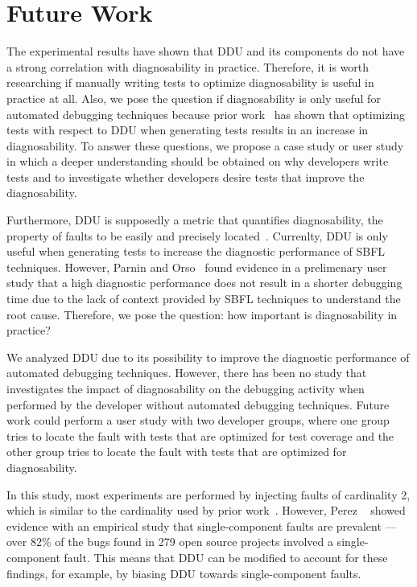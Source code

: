 \documentclass[twoside,a4paper,11pt]{memoir}
\begin{document}
\section{Future Work}
The experimental results have shown that DDU and its components do not have a strong correlation with diagnosability in practice.
Therefore, it is worth researching if manually writing tests to optimize diagnosability is useful in practice at all.
Also, we pose the question if diagnosability is only useful for automated debugging techniques because prior work~\cite{DBLP:conf/icse/PerezAD17} has shown that optimizing tests with respect to DDU when generating tests results in an increase in diagnosability.
To answer these questions, we propose a case study or user study in which a deeper understanding should be obtained on why developers write tests and to investigate whether developers desire tests that improve the diagnosability.

Furthermore, DDU is supposedly a metric that quantifies diagnosability, the property of faults to be easily and precisely located~\cite{730889}.
Currenlty, DDU is only useful when generating tests to increase the diagnostic performance of SBFL techniques.
However, Parnin and Orso~\cite{Parnin:2011:ADT:2001420.2001445} found evidence in a prelimenary user study that a high diagnostic performance does not result in a shorter debugging time due to the lack of context provided by SBFL techniques to understand the root cause.
Therefore, we pose the question: how important is diagnosability in practice?

We analyzed DDU due to its possibility to improve the diagnostic performance of automated debugging techniques.
However, there has been no study that investigates the impact of diagnosability on the debugging activity when performed by the developer without automated debugging techniques.
Future work could perform a user study with two developer groups, where one group tries to locate the fault with tests that are optimized for test coverage and the other group tries to locate the fault with tests that are optimized for diagnosability.

In this study, most experiments are performed by injecting faults of cardinality 2, which is similar to the cardinality used by prior work~\cite{DBLP:conf/icse/PerezAD17}.
However, Perez \etal~\cite{7927959} showed evidence with an empirical study that single-component faults are prevalent --- over 82\% of the bugs found in 279 open source projects involved a single-component fault.
This means that DDU can be modified to account for these findings, for example, by biasing DDU towards single-component faults.







\end{document}
